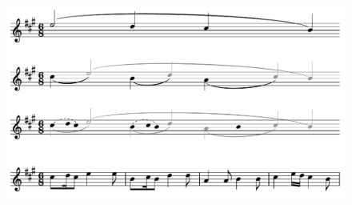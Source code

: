 \documentclass[a4paper,11pt]{article}
\begin{document}
    \begin{figure}
        \centering
        \includegraphics[width=0.9\linewidth]{K331Reduction.pdf}
        \caption{
        }
        \label{fig:music}
    \end{figure}
\end{document}
